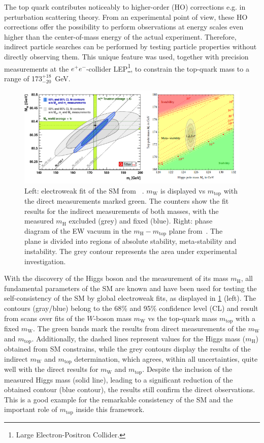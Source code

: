 The top quark contributes noticeably to higher-order (HO) corrections e.g. in perturbation scattering theory.  From an experimental point of view, these HO corrections offer the possibility to perform observations at energy scales even higher than the center-of-mass energy of the actual experiment. Therefore, indirect particle searches can be performed by testing particle properties without directly observing them. This unique feature was used, together with precision measurements at the $e^+e^-$-collider LEP\footnote{Large Electron-Positron Collider.}, to constrain the top-quark mass to a range of 173$^{+18}_{-20}$~GeV.~\cite{LEPEW:1994aa}
\begin{figure}[h]
	\centering
	\includegraphics[width=0.9\linewidth]{Pics/Relevanz}
	\caption{Left: electroweak fit of the SM from ~\cite{Baak:2012kk}. $m_{\text{W}}$ is displayed vs $m_{\text{top}}$ with the direct measurements marked green. The  counters show the fit results for the indirect measurements of both masses, with the measured $m_{\text{H}}$ excluded (grey) and fixed (blue).
		Right: phase diagram of the EW vacuum in the $m_{\text{H}}-m_{\text{top}}$ plane from~\cite{Buttazzo:2013uya}. The plane is divided into regions of absolute stability, meta-stability and instability. The grey contour represents the area under experimental investigation.}
	\label{fig:Relevanz}
\end{figure}

With the discovery of the Higgs boson and the measurement of its mass $m_{\text{H}}$, all fundamental parameters of the SM are known and have been used for testing the self-consistency of the SM by global electroweak fits, as displayed in \cref*{fig:Relevanz} (left). The contours (gray/blue) belong to the 68\% and 95\% confidence level (CL) and result from scans  over fits of the $W$-boson mass $m_{\text{W}}$ vs the top-quark mass $m_{\text{top}}$ with a fixed $m_{\text{W}}$. The green bands mark the results from direct measurements of the $m_{\text{W}}$ and $m_{\text{top}}$. 
Additionally, the dashed lines represent values for the Higgs mass ($m_{\text{H}}$) obtained from SM constrains, while the grey contours display the results of the indirect $m_{\text{W}}$ and $m_{\text{top}}$ determination, which agrees, within all uncertainties, quite well with the direct results for $m_{\text{W}}$ and $m_{\text{top}}$.
Despite the inclusion of the measured  Higgs mass (solid line), leading to a significant reduction of the obtained contour (blue contour), the results still confirm the direct observations. This is a good  example for the remarkable consistency of the SM and the important role of $m_{\text{top}}$ inside this framework.~\cite{Baak:2012kk}



